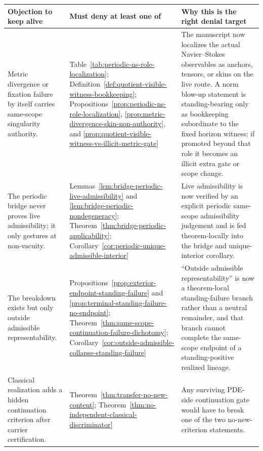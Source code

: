 \begin{tcolorbox}[title={Denial map: what must be denied to keep each objection alive (continued)}, colback=blue!2!white, colframe=blue!55!black, boxsep=1pt, left=2pt, right=2pt, top=2pt, bottom=2pt]
\scriptsize
\renewcommand{\arraystretch}{1.08}
\setlength{\tabcolsep}{3pt}
\begin{tabularx}{\textwidth}{@{}L{0.33\textwidth}L{0.31\textwidth}Y@{}}
\toprule
\textbf{Objection to keep alive} & \textbf{Must deny at least one of} & \textbf{Why this is the right denial target}\\
\midrule
Metric divergence or fixation failure by itself carries same-scope singularity authority. & Table~\ref{tab:periodic-ns-role-localization}; Definition~\ref{def:quotient-visible-witness-bookkeeping}; Propositions~\ref{prop:periodic-ns-role-localization}, \ref{prop:metric-divergence-skin-non-authority}, and \ref{prop:quotient-visible-witness-vs-illicit-metric-gate} & The manuscript now localizes the actual Navier--Stokes observables as anchors, tensors, or skins on the live route. A norm blow-up statement is standing-bearing only as bookkeeping subordinate to the fixed horizon witness; if promoted beyond that role it becomes an illicit extra gate or scope change.\\
The periodic bridge never proves live admissibility; it only gestures at non-vacuity. & Lemmas~\ref{lem:bridge-periodic-live-admissibility} and \ref{lem:bridge-periodic-nondegeneracy}; Theorem~\ref{thm:bridge-periodic-applicability}; Corollary~\ref{cor:periodic-unique-admissible-interior} & Live admissibility is now verified by an explicit periodic same-scope admissibility judgement and is fed theorem-locally into the bridge and unique-interior corollary.\\
The breakdown exists but only outside admissible representability. & Propositions~\ref{prop:exterior-endpoint-standing-failure} and \ref{prop:terminal-standing-failure-no-endpoint}; Theorem~\ref{thm:same-scope-continuation-failure-dichotomy}; Corollary~\ref{cor:outside-admissible-collapse-standing-failure} & ``Outside admissible representability'' is now a theorem-local standing-failure branch rather than a neutral remainder, and that branch cannot complete the same-scope endpoint of a standing-positive realized lineage.\\
Classical realization adds a hidden continuation criterion after carrier certification. & Theorem~\ref{thm:transfer-no-new-content}; Theorem~\ref{thm:no-independent-classical-discriminator} & Any surviving PDE-side continuation gate would have to break one of the two no-new-criterion statements.\\

\end{tabularx}
\end{tcolorbox}

